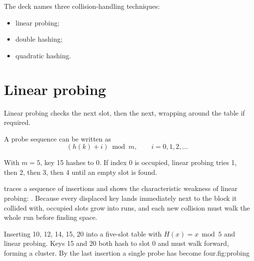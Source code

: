 The deck names three collision-handling techniques:

\begin{itemize}
  \item linear probing;
  \item double hashing;
  \item quadratic hashing.
\end{itemize}

\section{Linear probing}

Linear probing checks the next slot, then the next, wrapping around the table if required.

A probe sequence can be written as
\[
(h(k)+i)\bmod m,\qquad i=0,1,2,\dots
\]

\begin{workedexample}
With $m=5$, key 15 hashes to 0. If index 0 is occupied, linear probing tries 1, then 2, then 3, then 4 until an empty slot is found.
\end{workedexample}

 traces a sequence of insertions and shows the characteristic weakness of
linear probing: . Because every displaced key lands immediately next to the
block it collided with, occupied slots grow into runs, and each new collision must walk the
whole run before finding space.

\begin{utpfig}{Inserting 10, 12, 14, 15, 20 into a five-slot table with $H(x)=x\bmod5$ and
linear probing. Keys 15 and 20 both hash to slot 0 and must walk forward, forming a cluster.
By the last insertion a single probe has become four.}{fig:probing}
\end{utpfig}

